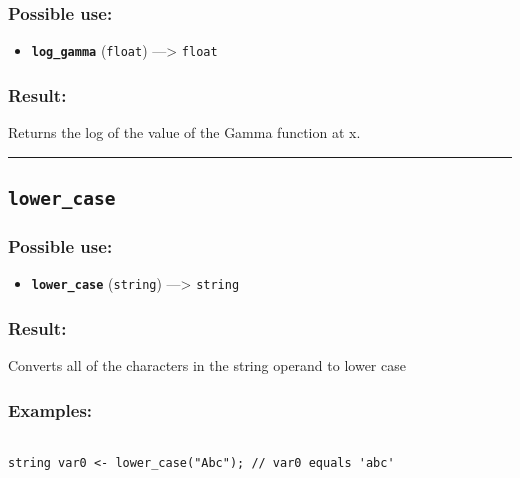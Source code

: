 \documentclass[]{book}
\providecommand{\tightlist}{%
  \setlength{\itemsep}{0pt}\setlength{\parskip}{0pt}}
\theoremstyle{definition}
\theoremstyle{definition}
\theoremstyle{definition}
\theoremstyle{remark}
\begin{document}
\subsubsection{Possible use:}\label{possible-use-330}

\begin{itemize}
\tightlist
\item
  \textbf{\texttt{log\_gamma}} (\texttt{float}) ---\textgreater{}
  \texttt{float}
\end{itemize}

\subsubsection{Result:}\label{result-320}

Returns the log of the value of the Gamma function at x.

\begin{center}\rule{0.5\linewidth}{\linethickness}\end{center}

\subsection{\texorpdfstring{\texttt{lower\_case}}{lower\_case}}\label{lower_case}

\subsubsection{Possible use:}\label{possible-use-331}

\begin{itemize}
\tightlist
\item
  \textbf{\texttt{lower\_case}} (\texttt{string}) ---\textgreater{}
  \texttt{string}
\end{itemize}

\subsubsection{Result:}\label{result-321}

Converts all of the characters in the string operand to lower case

\subsubsection{Examples:}\label{examples-229}

\begin{verbatim}
 
string var0 <- lower_case("Abc"); // var0 equals 'abc'
\end{verbatim}
\end{document}
